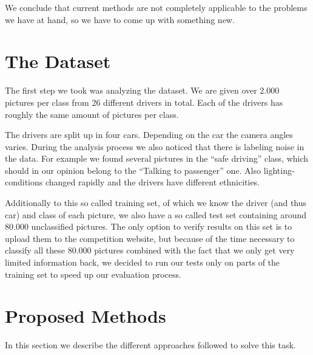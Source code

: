 \documentclass[10pt,twocolumn,letterpaper]{article}
\begin{document}
We conclude that current methods are not completely applicable to the problems we have at hand, so we have to come up with something new.




\section{The Dataset}
The first step we took was analyzing the dataset. We are given over 2.000 pictures per class from 26 different drivers in total. Each of the drivers has roughly the same amount of pictures per class. 

The drivers are split up in four cars. Depending on the car the camera angles varies. During the analysis process we also noticed that there is labeling noise in the data. For example we found several pictures in the ``safe driving'' class, which should in our opinion belong to the ``Talking to passenger'' one. Also lighting-conditions changed rapidly and the drivers have different ethnicities.


Additionally to this so called training set, of which we know the driver (and thus car) and class of each picture, we also have a so called test set containing around 80.000 unclassified pictures. The only option to verify results on this set is to upload them to the competition website, but because of the time necessary to classify all these 80.000 pictures combined with the fact that we only get very limited information back, we decided to run our tests only on parts of the training set to speed up our evaluation process.



\section{Proposed Methods}
In this section we describe the different approaches followed to solve this task.
\end{document}
